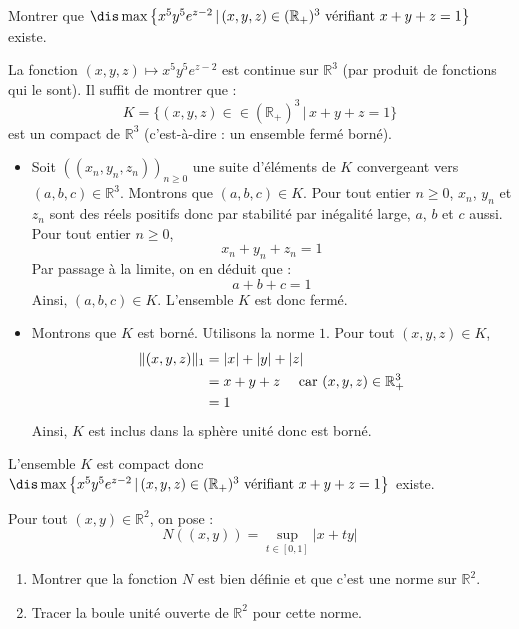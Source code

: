 \documentclass[a4paper,10pt]{report}
\begin{document}
\begin{Exercice}{} Montrer que $\dis \max \left\lbrace x^5y^5 e^{z-2} \, \vert \, (x,y,z) \in (\mathbb{R}_+)^3 \hbox{ vérifiant } x+y+z =1 \right\rbrace$ existe.
\end{Exercice}

\corr La fonction $(x,y,z) \mapsto x^5y^5 e^{z-2}$ est continue sur $\mathbb{R}^3$ (par produit de fonctions qui le sont). Il suffit de montrer que :
$$K= \lbrace (x,y,z) \in \in (\mathbb{R}_+)^3 \, \vert \, x+y+z=1 \rbrace$$
est un compact de $\mathbb{R}^3$ (c'est-à-dire : un ensemble fermé borné).

\begin{itemize}
\item Soit $((x_n,y_n,z_n))_{n \geq 0}$ une suite d'éléments de $K$ convergeant vers $(a,b,c) \in \mathbb{R}^3$. Montrons que $(a,b,c) \in K$. Pour tout entier $n \geq 0$, $x_n$, $y_n$ et $z_n$ sont des réels positifs donc par stabilité par inégalité large, $a$, $b$ et $c$ aussi. Pour tout entier $n \geq 0$,
$$ x_n + y_n + z_n = 1$$
Par passage à la limite, on en déduit que :
$$ a+b+c=1$$
Ainsi, $(a,b,c) \in K$. L'ensemble $K$ est donc fermé.
\item Montrons que $K$ est borné. Utilisons la norme $1$. Pour tout $(x,y,z) \in K$,
\begin{align*}
\Vert (x,y,z) \Vert_1 & = \vert x \vert + \vert y \vert + \vert z \vert \\
& = x+y+z \quad \hbox{ car } (x,y,z) \in \mathbb{R}_+^{3} \\
& = 1
\end{align*}
Ainsi, $K$ est inclus dans la sphère unité donc est borné.
\end{itemize}
L'ensemble $K$ est compact donc $\dis \max \left\lbrace x^5y^5 e^{z-2} \, \vert \, (x,y,z) \in (\mathbb{R}_+)^3 \hbox{ vérifiant } x+y+z =1 \right\rbrace$ existe.


\begin{Exercice}{} Pour tout $(x,y) \in \mathbb{R}^2$, on pose :
$$ N((x,y)) = \sup_{t \in [0,1]} \vert x+ty \vert$$

\begin{enumerate}
\item Montrer que la fonction $N$ est bien définie et que c'est une norme sur $\mathbb{R}^2$.
\item Tracer la boule unité ouverte de $\mathbb{R}^2$ pour cette norme.
\end{enumerate}
\end{Exercice}
\end{document}
